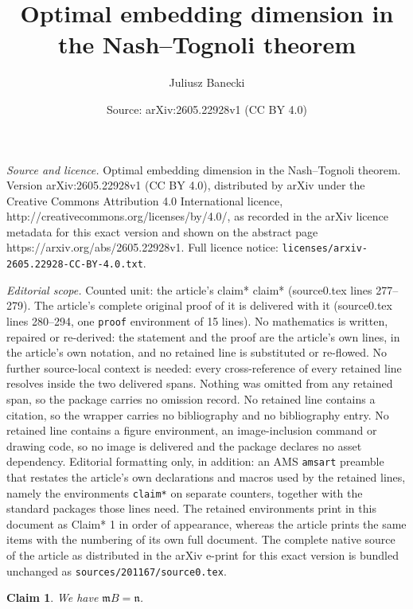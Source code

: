\documentclass[10pt,a4paper]{amsart}
\title{Optimal embedding dimension in the Nash--Tognoli theorem}
\author{Juliusz Banecki}
\date{Source: arXiv:2605.22928v1 (CC BY 4.0)}
\newtheorem{claim*}{Claim}
\begin{document}
\maketitle

\noindent\emph{Source and licence.} Optimal embedding dimension in the Nash--Tognoli theorem. Version arXiv:2605.22928v1 (CC BY 4.0), distributed by arXiv under the Creative Commons Attribution 4.0 International licence, http://creativecommons.org/licenses/by/4.0/, as recorded in the arXiv licence metadata for this exact version and shown on the abstract page https://arxiv.org/abs/2605.22928v1. Full licence notice: \texttt{licenses/arxiv-2605.22928-CC-BY-4.0.txt}.\par\smallskip

\noindent\textit{Editorial scope.} Counted unit: the article's claim* claim* (source0.tex lines 277--279). The article's complete original proof of it is delivered with it (source0.tex lines 280--294, one \texttt{proof} environment of 15 lines). No mathematics is written, repaired or re-derived: the statement and the proof are the article's own lines, in the article's own notation, and no retained line is substituted or re-flowed.  No further source-local context is needed: every cross-reference of every retained line resolves inside the two delivered spans.  Nothing was omitted from any retained span, so the package carries no omission record.  No retained line contains a citation, so the wrapper carries no bibliography and no bibliography entry.  No retained line contains a figure environment, an image-inclusion command or drawing code, so no image is delivered and the package declares no asset dependency.  Editorial formatting only, in addition: an AMS \texttt{amsart} preamble that restates the article's own declarations and macros used by the retained lines, namely the environments \texttt{claim*} on separate counters, together with the standard packages those lines need.  The retained environments print in this document as Claim* 1 in order of appearance, whereas the article prints the same items with the numbering of its own full document.  The complete native source of the article as distributed in the arXiv e-print for this exact version is bundled unchanged as \texttt{sources/201167/source0.tex}.
\begin{claim*}
We have $\mathfrak mB=\mathfrak n$.
\end{claim*}
\end{document}
